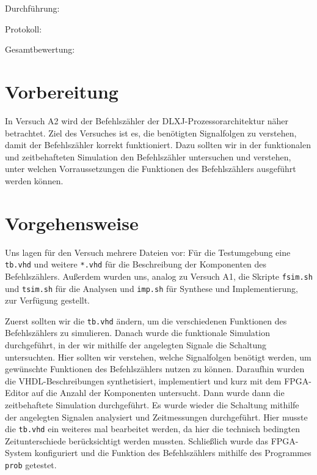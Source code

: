 \documentclass[12pt,a4paper]{scrartcl}
\begin{document}
Durchf\"uhrung:

Protokoll:

Gesamtbewertung:
\clearpage



\section{Vorbereitung}
In Versuch A2 wird der Befehlsz\"ahler der DLXJ-Prozessorarchitektur n\"aher betrachtet.
Ziel des Versuches ist es, die ben\"otigten Signalfolgen zu verstehen, damit der Befehlsz\"ahler korrekt funktioniert.
Dazu sollten wir in der funktionalen und zeitbehafteten Simulation den Befehlsz\"ahler untersuchen und verstehen, unter welchen Vorraussetzungen
die Funktionen des Befehlsz\"ahlers ausgef\"uhrt werden k\"onnen.

\section{Vorgehensweise}

Uns lagen f\"ur den Versuch mehrere Dateien vor: F\"ur die Testumgebung eine \texttt{tb.vhd} und weitere \texttt{*.vhd} f\"ur die Beschreibung der Komponenten des Befehlsz\"ahlers. Au\ss erdem wurden uns, analog zu Versuch A1, die Skripte \texttt{fsim.sh} und \texttt{tsim.sh} f\"ur die Analysen und \texttt{imp.sh} f\"ur Synthese und Implementierung, zur Verf\"ugung gestellt.

Zuerst sollten wir die \texttt{tb.vhd} \"andern, um die verschiedenen Funktionen des Befehlsz\"ahlers zu simulieren.
Danach wurde die funktionale Simulation durchgef\"uhrt, in der wir mithilfe der angelegten Signale die Schaltung untersuchten.
Hier sollten wir verstehen, welche Signalfolgen ben\"otigt werden, um gew\"unschte Funktionen des Befehlsz\"ahlers nutzen zu k\"onnen.
Daraufhin wurden die VHDL-Beschreibungen synthetisiert, implementiert und kurz mit dem FPGA-Editor auf die Anzahl der Komponenten untersucht.
Dann wurde dann die zeitbehaftete Simulation durchgef\"uhrt. Es wurde wieder die Schaltung mithilfe der angelegten Signalen analysiert und Zeitmessungen durchgef\"uhrt.
Hier musste die \texttt{tb.vhd} ein weiteres mal bearbeitet werden, da hier die technisch bedingten Zeitunterschiede ber\"ucksichtigt werden mussten.
Schlie\ss lich wurde das FPGA-System konfiguriert und die Funktion des Befehlsz\"ahlers mithilfe des Programmes \texttt{prob} getestet.


\newpage
\end{document}

